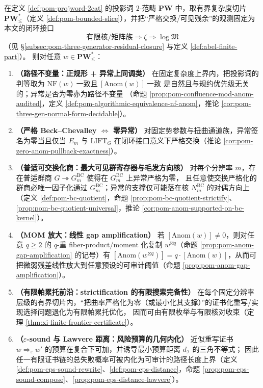 \begin{theorem}\label{thm:dephys-offline-hair-curvature-reduction}
在定义 \ref{def:pom-projword-2cat} 的投影词 \(2\)-范畴 \(\mathbf{PW}\) 中，取有界复杂度切片 \(\mathbf{PW}^{\ast}_{\le}\)（定义 \ref{def:pom-bounded-slice}），并把“严格交换/可见残余”的观测固定为本文的闭环接口
\[
\text{有限核/矩阵族}\Rightarrow \zeta \Rightarrow \log\mathfrak{M}
\]
（见 \S\ref{subsec:pom-three-generator-residual-closure} 与定义 \ref{def:abel-finite-part}）。
则对任意 \(w\in\mathbf{PW}^{\ast}_{\le}\)：
\begin{enumerate}
  \item \textbf{（路径不变量：正规形 + 异常上同调类）}
  在固定复杂度上界内，把投影词的判等取为
  \(
  \mathrm{NF}(w)\ \text{一致且}\ [\mathrm{Anom}(w)]\ \text{一致}
  \)
  是自然且与规约优先级无关的；异常是否为零亦为路径不变量
  （命题 \ref{prop:pom-confluence-mod-anom-audited}，定义 \ref{def:pom-algorithmic-equivalence-nf-anom}，推论 \ref{cor:pom-three-gen-normal-form-decidable}）。
  \item \textbf{（严格 Beck--Chevalley \texorpdfstring{$\Longleftrightarrow$}{<->} 零异常）}
  对固定势参数与扭曲通道族，异常签名为零当且仅当
  \(E_m\) 与 \(\mathrm{LIFT}_G\) 在闭环接口意义下严格交换（推论 \ref{cor:pom-zero-anom-pullback-exactness}）。
  \item \textbf{（普适可交换化商：最大可见群寄存器与毛发方向核）}
  对每个分辨率 \(m\)，存在普适群商 \(G\twoheadrightarrow G^{\mathrm{BC}}_m\) 使得在 \(G^{\mathrm{BC}}_m\) 上异常严格为零，
  且任意使交换严格化的群商必唯一因子化通过 \(G^{\mathrm{BC}}_m\)；异常的支撑仅可能落在核 \(N^{\mathrm{BC}}_m\) 的对偶方向上
  （定义 \ref{def:pom-bc-quotient}，命题 \ref{prop:pom-bc-quotient-strictify}、\ref{prop:pom-bc-quotient-universal}，推论 \ref{cor:pom-anom-supported-on-bc-kernel}）。
  \item \textbf{（MOM 放大：线性 gap amplification）}
  若 \([\mathrm{Anom}(w)]\neq 0\)，则对任意 \(q\ge 2\) 的 \(q\)-重 fiber-product/moment 化复制 \(w^{\boxtimes q}\)（命题 \ref{prop:pom-anom-gap-amplification} 的记号）有
  \(
  [\mathrm{Anom}(w^{\boxtimes q})]=q\cdot[\mathrm{Anom}(w)]
  \)，从而可把微弱残差线性放大到任意预设的可审计阈值（命题 \ref{prop:pom-anom-gap-amplification}）。
  \item \textbf{（有限帕累托前沿：strictification 的有限搜索完备性）}
  在每个固定分辨率层级的有界切片内，“把曲率严格化为零（或最小化其支撑）”的证书化重写/实现选择问题退化为有限帕累托优化，
  因而可由有限枚举与有限核对收束（定理 \ref{thm:xi-finite-frontier-certificate}）。
  \item \textbf{（\texorpdfstring{$\varepsilon$}{eps}-sound 与 Lawvere 距离：风险预算的几何内化）}
  近似重写证书 \(w\Longrightarrow_{\varepsilon} w'\) 的预算在复合下可加，并诱导最小预算距离 \(d_{\mathcal I}\) 的三角不等式；
  因此任一有限证书链的总失败概率可被内化为可审计的路径长度上界（定义 \ref{def:pom-eps-sound-rewrite}、\ref{def:pom-eps-distance}，命题 \ref{prop:pom-eps-sound-compose}、\ref{prop:pom-eps-distance-lawvere}）。
\end{enumerate}
\end{theorem}

